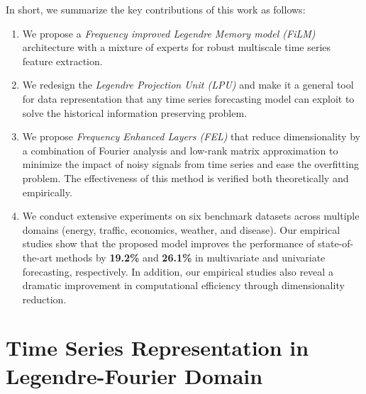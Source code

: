 \documentclass{article}
\begin{document}
In short, we summarize the key contributions of this work as follows:
\begin{enumerate}
    \item We propose a {\it Frequency improved Legendre Memory model (FiLM)} architecture with a mixture of experts for robust multiscale time series feature extraction.
    \item We redesign the {\it Legendre Projection Unit (LPU)} and make it a general tool for data representation that any time series forecasting model can exploit to solve the historical information preserving problem.
    \item We propose {\it Frequency Enhanced Layers (FEL)} that reduce dimensionality by a combination of Fourier analysis and low-rank matrix approximation to minimize the impact of noisy signals from time series and ease the overfitting problem. The effectiveness of this method is verified both theoretically and empirically.
    \item We conduct extensive experiments on six benchmark datasets across multiple domains (energy, traffic, economics, weather, and disease). Our empirical studies show that the proposed model improves the performance of state-of-the-art methods by \textbf{19.2\%} and \textbf{26.1\%} in multivariate and univariate forecasting, respectively. In addition, our empirical studies also reveal a dramatic improvement in computational efficiency through dimensionality reduction. 
\end{enumerate} 






\section{Time Series Representation in Legendre-Fourier Domain} \label{sec:theoretical}
\end{document}
